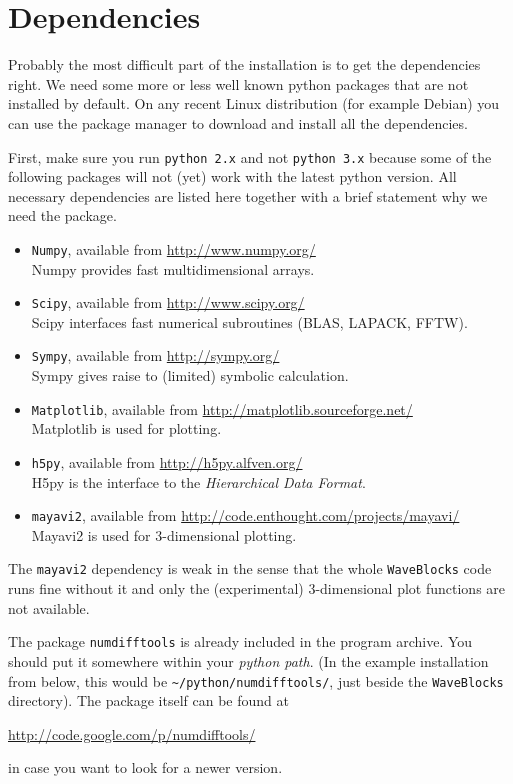 \documentclass[a4paper,10pt]{report}
\begin{document}
\section{Dependencies}

Probably the most difficult part of the installation is to get the dependencies
right. We need some more or less well known python packages that are not installed
by default. On any recent Linux distribution (for example Debian) you can use the
package manager to download and install all the dependencies.

First, make sure you run \texttt{python 2.x} and not \texttt{python 3.x} because
some of the following packages will not (yet) work with the latest python version.
All necessary dependencies are listed here together with a brief statement why we
need the package.

\begin{itemize}
  \item \texttt{Numpy}, available from \url{http://www.numpy.org/} \\
        Numpy provides fast multidimensional arrays.
  \item \texttt{Scipy}, available from \url{http://www.scipy.org/} \\
        Scipy interfaces fast numerical subroutines (BLAS, LAPACK, FFTW).
  \item \texttt{Sympy}, available from \url{http://sympy.org/} \\
        Sympy gives raise to (limited) symbolic calculation.
  \item \texttt{Matplotlib}, available from \url{http://matplotlib.sourceforge.net/} \\
        Matplotlib is used for plotting.
  \item \texttt{h5py}, available from \url{http://h5py.alfven.org/} \\
        H5py is the interface to the \emph{Hierarchical Data Format}.
  \item \texttt{mayavi2}, available from \url{http://code.enthought.com/projects/mayavi/} \\
        Mayavi2 is used for 3-dimensional plotting.
\end{itemize}

The \texttt{mayavi2} dependency is weak in the sense that the whole \texttt{WaveBlocks}
code runs fine without it and only the (experimental) 3-dimensional plot functions
are not available.

The package \texttt{numdifftools} is already included in the program archive.
You should put it somewhere within your \emph{python path}. (In the example installation
from below, this would be \verb|~/python/numdifftools/|, just beside the
\texttt{WaveBlocks} directory). The package itself can be found at
\begin{center}
  \url{http://code.google.com/p/numdifftools/}
\end{center}
in case you want to look for a newer version.
\end{document}
